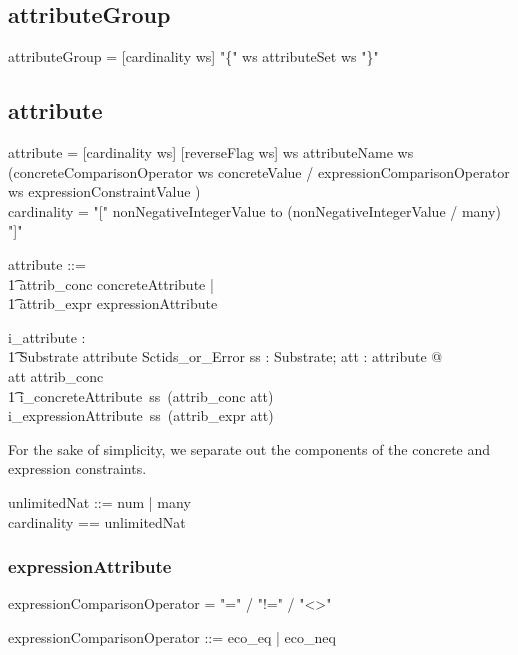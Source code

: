 \documentclass{article}
\def\bnf#1{{\scriptsize {{#1}} }}
\begin{document}
\subsection{attributeGroup}
\begin{framed}
\noindent
\bnf{attributeGroup = [cardinality ws] "\{" ws attributeSet ws "\}"}
\end{framed}


\subsection{attribute}
\begin{framed}
\noindent
\bnf{attribute = [cardinality ws] [reverseFlag ws] ws attributeName ws 
	(concreteComparisonOperator ws concreteValue / 
	expressionComparisonOperator ws expressionConstraintValue )} \\
\bnf{cardinality = "[" nonNegativeIntegerValue to (nonNegativeIntegerValue / many) "]" }
\end{framed}


\begin{zed}
   attribute ::= \\
\t1 attrib\_conc \ldata concreteAttribute \rdata | \\
\t1 attrib\_expr \ldata expressionAttribute \rdata
\end{zed}

\begin{gendef}
   i\_attribute : \\
\t1 Substrate \fun attribute \fun Sctids\_or\_Error
\where
   \forall ss : Substrate; att : attribute @ \\
   \IF att \in \ran attrib\_conc \\
\t1 \THEN i\_concreteAttribute~ss~(attrib\_conc \inv att) \\
   \ELSE i\_expressionAttribute~ss~(attrib\_expr \inv att)
\end{gendef}

For the sake of simplicity, we separate out the components of the concrete and expression constraints.

\begin{zed}
unlimitedNat ::= num \ldata \nat \rdata | many \\
cardinality == \nat \cross unlimitedNat \\
[reverseFlag] 
\end{zed}

\subsubsection{expressionAttribute}
\begin{framed}
\noindent
\bnf{expressionComparisonOperator = "=" / "!=" / "\textless\textgreater"}
\end{framed}
\begin{zed}
expressionComparisonOperator ::= eco\_eq | eco\_neq
\end{zed}
\end{document}
